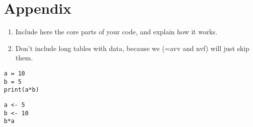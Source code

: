 \documentclass[report]{subfiles}
\begin{document}
\section{Appendix}

\begin{enumerate}
\item Include here the core parts of your code, and explain how it works.
\item  Don't include long tables with data, because we (=avv and nvf) will just skip them.
\end{enumerate}



\begin{verbatim}
a = 10
b = 5
print(a*b)
\end{verbatim}


\begin{verbatim}
a <- 5
b <- 10
b*a
\end{verbatim}
\end{document}
